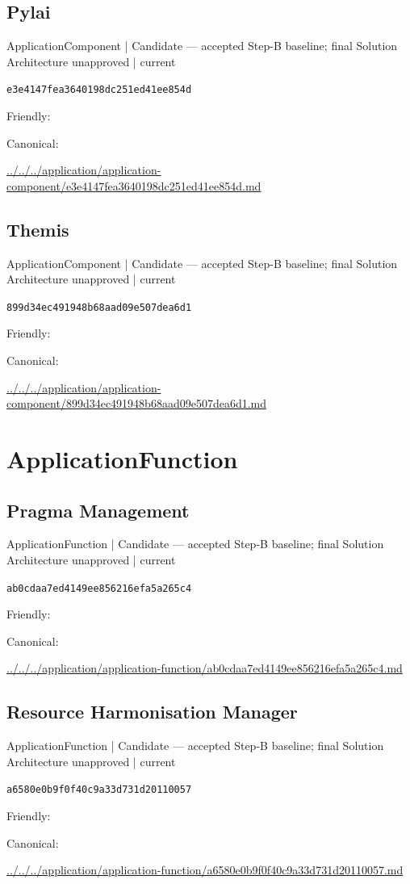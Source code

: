 \documentclass[10pt,a4paper]{article}
\begin{document}
\subsection*{Pylai}
{\small ApplicationComponent | Candidate — accepted Step-B baseline; final Solution Architecture unapproved | current}\par
\texttt{e3e4147fea3640198dc251ed41ee854d}\par
Friendly: \par
Canonical: \par
{\footnotesize\url{../../../application/application-component/e3e4147fea3640198dc251ed41ee854d.md}}\par
\subsection*{Themis}
{\small ApplicationComponent | Candidate — accepted Step-B baseline; final Solution Architecture unapproved | current}\par
\texttt{899d34ec491948b68aad09e507dea6d1}\par
Friendly: \par
Canonical: \par
{\footnotesize\url{../../../application/application-component/899d34ec491948b68aad09e507dea6d1.md}}\par
\section*{ApplicationFunction}
\subsection*{Pragma Management}
{\small ApplicationFunction | Candidate — accepted Step-B baseline; final Solution Architecture unapproved | current}\par
\texttt{ab0cdaa7ed4149ee856216efa5a265c4}\par
Friendly: \par
Canonical: \par
{\footnotesize\url{../../../application/application-function/ab0cdaa7ed4149ee856216efa5a265c4.md}}\par
\subsection*{Resource Harmonisation Manager}
{\small ApplicationFunction | Candidate — accepted Step-B baseline; final Solution Architecture unapproved | current}\par
\texttt{a6580e0b9f0f40c9a33d731d20110057}\par
Friendly: \par
Canonical: \par
{\footnotesize\url{../../../application/application-function/a6580e0b9f0f40c9a33d731d20110057.md}}\par
\end{document}

